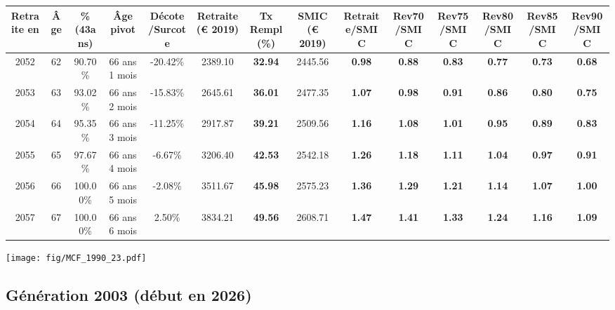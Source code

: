 \begin{adjustbox}{max width=\textwidth} 
\begin{tabular}[htb]{|c|c||c|c|c||c|c||c||c|c|c|c|c|c|} 
\hline 
 Retraite en &  Âge &  \%(43ans) &  Âge pivot &  Décote/Surcote &  Retraite (\euro{} 2019) &  Tx Rempl(\%) &  SMIC (\euro{} 2019) &  Retraite/SMIC &  Rev70/SMIC &  Rev75/SMIC &  Rev80/SMIC &  Rev85/SMIC &  Rev90/SMIC \\ 
\hline \hline 
 2052 &  62 &  90.70\% &  66 ans 1 mois &  -20.42\% &  2389.10 &  {\bf 32.94} &  2445.56 &  {\bf {\color{red} 0.98}} &  {\bf {\color{red} 0.88}} &  {\bf {\color{red} 0.83}} &  {\bf {\color{red} 0.77}} &  {\bf {\color{red} 0.73}} &  {\bf {\color{red} 0.68}} \\ 
\hline 
 2053 &  63 &  93.02\% &  66 ans 2 mois &  -15.83\% &  2645.61 &  {\bf 36.01} &  2477.35 &  {\bf 1.07} &  {\bf {\color{red} 0.98}} &  {\bf {\color{red} 0.91}} &  {\bf {\color{red} 0.86}} &  {\bf {\color{red} 0.80}} &  {\bf {\color{red} 0.75}} \\ 
\hline 
 2054 &  64 &  95.35\% &  66 ans 3 mois &  -11.25\% &  2917.87 &  {\bf 39.21} &  2509.56 &  {\bf 1.16} &  {\bf 1.08} &  {\bf 1.01} &  {\bf {\color{red} 0.95}} &  {\bf {\color{red} 0.89}} &  {\bf {\color{red} 0.83}} \\ 
\hline 
 2055 &  65 &  97.67\% &  66 ans 4 mois &  -6.67\% &  3206.40 &  {\bf 42.53} &  2542.18 &  {\bf 1.26} &  {\bf 1.18} &  {\bf 1.11} &  {\bf 1.04} &  {\bf {\color{red} 0.97}} &  {\bf {\color{red} 0.91}} \\ 
\hline 
 2056 &  66 &  100.00\% &  66 ans 5 mois &  -2.08\% &  3511.67 &  {\bf 45.98} &  2575.23 &  {\bf 1.36} &  {\bf 1.29} &  {\bf 1.21} &  {\bf 1.14} &  {\bf 1.07} &  {\bf 1.00} \\ 
\hline 
 2057 &  67 &  100.00\% &  66 ans 6 mois &  2.50\% &  3834.21 &  {\bf 49.56} &  2608.71 &  {\bf 1.47} &  {\bf 1.41} &  {\bf 1.33} &  {\bf 1.24} &  {\bf 1.16} &  {\bf 1.09} \\ 
\hline 
\hline 
\end{tabular} 
\end{adjustbox} 
 
 \vspace{0.1cm} 

 \begin{center}\texttt{[image: fig/MCF\_1990\_23.pdf]}\end{center} \label{fig/MCF_1990_23.pdf} 

\newpage 
 
\subsection{Génération 2003 (début en 2026)} 

